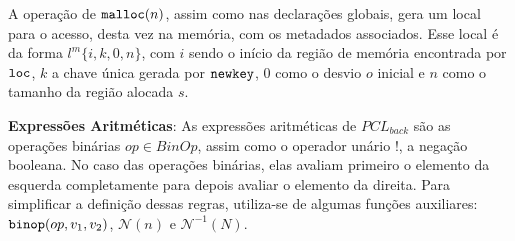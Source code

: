     






A operação de $\texttt{malloc}(n)$, assim como nas declarações globais, gera um local para o acesso, desta vez na memória, com os metadados associados. Esse local é da forma $l^m\{i, k, 0, n\}$, com $i$ sendo o início da região de memória encontrada por $\texttt{loc}$, $k$ a chave única gerada por $\texttt{newkey}$, 0 como o desvio $o$ inicial e $n$ como o tamanho da região alocada $s$.

\textbf{Expressões Aritméticas}: As expressões aritméticas de $PCL_{back}$ são as operações binárias $op \in BinOp$, assim como o operador unário $!$, a negação booleana. No caso das operações binárias, elas avaliam primeiro o elemento da esquerda completamente para depois avaliar o elemento da direita. Para simplificar a definição dessas regras, utiliza-se de algumas funções auxiliares: $\texttt{binop}(op, v_1, v_2)$, $\mathcal{N}(n)$ e $\mathcal{N}^{-1}(N)$. 

